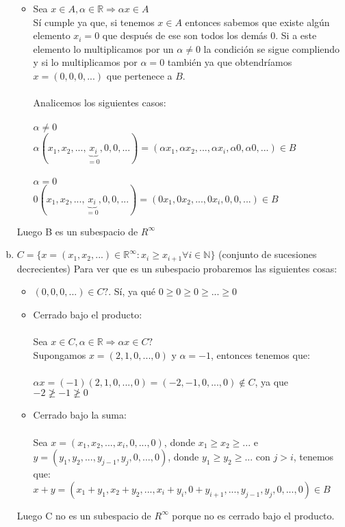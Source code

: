 \documentclass{article}
\begin{document}
\begin{enumerate}[a.]
\begin{itemize}
		\item Sea $x \in A, \alpha \in \mathbb{R} \Rightarrow \alpha x \in A$ \\
		Sí cumple ya que, si tenemos $x \in A$ entonces sabemos que existe algún elemento $x_i = 0$ que después de ese son todos
		los demás 0. Si a este elemento lo multiplicamos por un $\alpha \not = 0$ la condición se sigue compliendo y si 
		lo multiplicamos por $\alpha = 0$ también ya que obtendríamos $x = (0,0,0,...)$ que pertenece a $B$. \\ \\
		Analicemos los siguientes casos: \\ \\ 
		$\alpha \not = 0$ \\
		$\alpha (x_1,x_2,...,\underbrace{x_i}_{= 0},0,0,...) = (\alpha x_1, \alpha x_2, ... , \alpha x_i ,\alpha 0, \alpha 0,... ) \in B$ \\ \\
		$\alpha = 0$ \\
		$0 (x_1,x_2,...,\underbrace{x_i}_{= 0},0,0,...) = (0 x_1, 0 x_2, ... , 0 x_i , 0,0,... ) \in B$
	\end{itemize}
	Luego B es un subespacio de $R^\infty$
\item
	$C = \lbrace x = (x_1,x_2,...) \in \mathbb{R}^\infty : x_i \geq x_{i+1} \forall i \in \mathbb{N} \rbrace$ (conjunto de sucesiones decrecientes)
	Para ver que es un subespacio probaremos las siguientes cosas: \\
	\begin{itemize}
		\item
			$(0,0,0,...) \in C?$. Sí, ya qué $0 \geq 0 \geq 0  \geq ... \geq 0$
		\item
			Cerrado bajo el producto: \\ \\
			Sea $x \in C, \alpha \in \mathbb{R} \Rightarrow \alpha x \in C?$ \\
			Supongamos $x = (2,1,0,...,0)$ y $\alpha = -1$, entonces tenemos que: \\ \\
			$\alpha x = (-1) (2,1,0,...,0) = (-2,-1,0,...,0) \not \in C$, ya que $-2 \not \geq -1 \not \geq 0$
		\item
			Cerrado bajo la suma: \\ \\
			Sea $x = (x_1,x_2,...,x_i,0,...,0)$, donde $x_1 \geq x_2 \geq ... $ e $y = (y_1,y_2,...,y_{j-1},y_j,0,...,0)$,
			donde $y_1 \geq y_2 \geq ... $ con $j > i$, tenemos que: \\
			$x+y = (x_1+y_1,x_2+y_2,...,x_i+y_i,0+y_{i+1},...,y_{j-1},y_j,0,...,0) \in B$
	\end{itemize}
	Luego C no es un subespacio de $R^\infty$ porque no es cerrado bajo el producto.


\end{enumerate}
\end{document}
